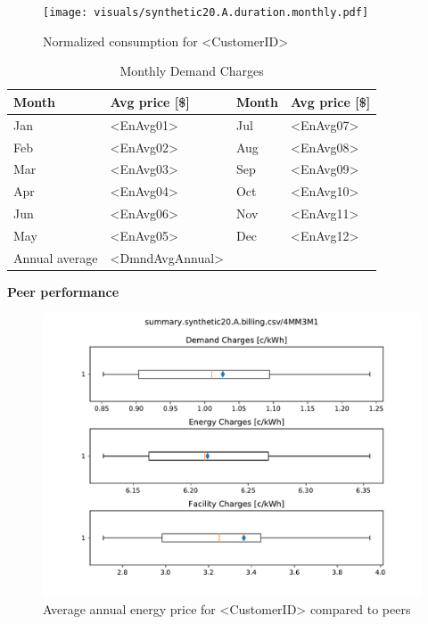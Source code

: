 \documentclass[11pt]{article}
\begin{document}
\pagestyle{demand}
\lipsum[1][1-7]

\begin{figure}[!h]
\centering
\texttt{[image: visuals/synthetic20.A.duration.monthly.pdf]}
\caption{Normalized consumption for <CustomerID>}
\label{fig:heatmap}
\end{figure}

\lipsum[1][1-7]

\begin{table}[th!]
  \centering
  \caption{Monthly Demand Charges}
  \vspace{1.5ex}
  \label{tab:annual}
  \begin{tabular}{llll}
    Month & Avg price [\$] & Month & Avg price [\$] \\
    \midrule
    Jan & <EnAvg01> & Jul & <EnAvg07> \\
    Feb & <EnAvg02> & Aug & <EnAvg08> \\
    Mar & <EnAvg03> & Sep & <EnAvg09> \\
    Apr & <EnAvg04> & Oct & <EnAvg10> \\
    Jun & <EnAvg06> & Nov & <EnAvg11> \\
    May & <EnAvg05> & Dec & <EnAvg12> \\
    \midrule
    Annual average & <DmndAvgAnnual>
  \end{tabular}
\end{table}

\vspace{3ex}
\textbf{\Large Peer performance}
\vspace{1ex}

\lipsum[1][1-7]

\begin{figure}[!h]
\centering
\includegraphics[width=\columnwidth, page=1, trim=0in 0.45in 0in 4.25in, clip]{visuals/synthetic20.A.whisker.pdf}
\caption{Average annual energy price for <CustomerID> compared to peers}
\label{fig:PeerCompDmnd}
\end{figure}
\end{document}
